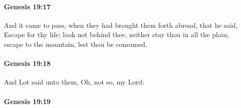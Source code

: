
		\paragraph{Genesis 19:17} %
			\label{GENESIS-19-17}

			And it came to pass, when they had brought them forth abroad, that he said, Escape for thy life; look not behind thee, neither stay thou in all the plain; escape to the mountain, lest thou be consumed.


		\paragraph{Genesis 19:18} %
			\label{GENESIS-19-18}

			And Lot said unto them, Oh, not so, my Lord:


		\paragraph{Genesis 19:19} %
			\label{GENESIS-19-19}


